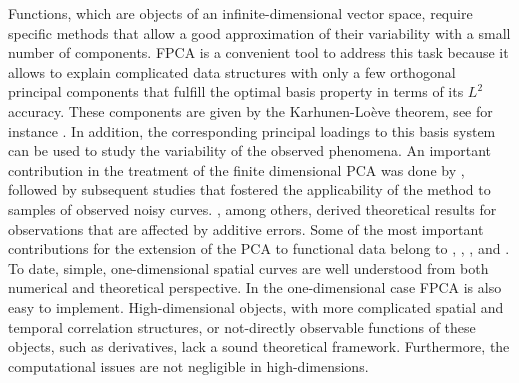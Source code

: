 Functions, which are objects of an infinite-dimensional vector space, require specific methods that allow a good approximation of their variability with a small number of components. FPCA is a convenient tool to address this task because it allows to explain complicated data structures with only a few orthogonal principal components that fulfill the optimal basis property in terms of its $L^2$ accuracy. These components are given by the Karhunen-Lo{\`e}ve theorem, see for instance \cite{Bosq:2000}. %
In addition, the corresponding principal loadings to this basis system can be used to study the variability of the observed phenomena. %
An important contribution in the treatment of the finite dimensional PCA was done by \cite{Pousse:82}, followed by subsequent studies that fostered the applicability of the method to samples of observed noisy curves. \cite{Besse:86}, among others, derived theoretical results for observations that are affected by additive errors. Some of the most important contributions for the extension of the PCA to functional data belong to \cite{cardot1999functional}, \cite{Cardot2007}, \cite{Vieu2006}, \cite{Mas2002117} and \cite{mas2008local}.
To date, simple, one-dimensional spatial curves are well understood from both numerical and theoretical perspective. In the one-dimensional case FPCA is also easy to implement. High-dimensional objects, with more complicated spatial and temporal correlation structures, or not-directly observable functions of these objects, such as derivatives, lack a sound theoretical framework. Furthermore, the computational issues are not negligible in high-dimensions. 

